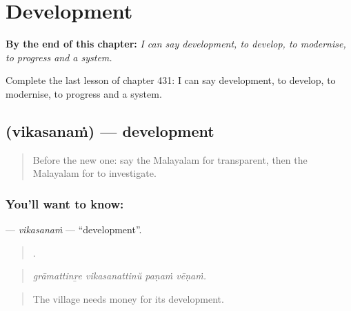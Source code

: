 
\chapter{Development}
\label{ch:ml-development}

\begin{chapteropening}
\textbf{By the end of this chapter:} \emph{I can say development, to develop, to modernise, to progress and a system.}

Complete the last lesson of chapter 431: I can say development, to develop, to modernise, to progress and a system.
\end{chapteropening}

\section[\texorpdfstring{\ml{വികസനം} (vikasanaṁ)}{വികസനം (vikasanaṁ)}]{ (vikasanaṁ) — development}

\label{lesson:ML-C431-vikasanam}



\begin{quote}
Before the new one: say the Malayalam for transparent, then the Malayalam for to investigate.
\end{quote}

\subsection*{You'll want to know: }
\textbf{} — \emph{vikasanaṁ} — \textquotedblleft{}development\textquotedblright{}.

\begin{quote}
   .
\end{quote}

\begin{quote}
\emph{grāmattinṟe vikasanattinŭ paṇaṁ vēṇaṁ.}
\end{quote}

\begin{quote}
The village needs money for its development.
\end{quote}

